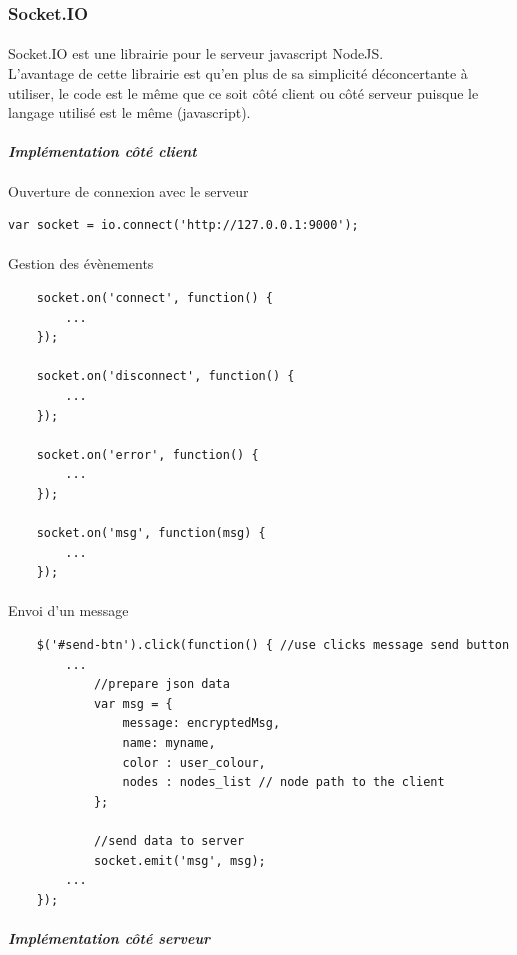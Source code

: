 \documentclass[a4paper,12pt]{report}
\begin{document}
	\subsubsection{Socket.IO}
	\paragraph*{}
	Socket.IO est une librairie pour le serveur javascript NodeJS. \\
	L'avantage de cette librairie est qu'en plus de sa simplicité déconcertante à utiliser, le code est le même que ce soit côté client ou côté serveur puisque le langage utilisé est le même (javascript). 
	\paragraph*{}
	\textit{\textbf{Implémentation côté client}} 
	\paragraph*{}
	Ouverture de connexion avec le serveur
	\begin{lstlisting}
var socket = io.connect('http://127.0.0.1:9000');
	\end{lstlisting}
	\paragraph*{}
	Gestion des évènements 
	\begin{lstlisting}
	socket.on('connect', function() {
		...
	});

	socket.on('disconnect', function() {
		...
	});

	socket.on('error', function() {
		...
	});

	socket.on('msg', function(msg) {
		...
	});
	\end{lstlisting}	
	\paragraph*{}
	Envoi d'un message 
	\begin{lstlisting}
	$('#send-btn').click(function() { //use clicks message send button	
		...
	    	//prepare json data
			var msg = {
				message: encryptedMsg,
				name: myname,
				color : user_colour,
				nodes : nodes_list // node path to the client
			};

			//send data to server
			socket.emit('msg', msg);
		...
	});
	\end{lstlisting}		 
	\paragraph*{}
	\textit{\textbf{Implémentation côté serveur}} 
\end{document}
